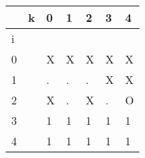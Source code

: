 \documentclass{article}
\begin{document}
    \begin{center}

    \large
        \begin{tabular}{| m{.35cm} | m{.35cm} | m{.35cm} | m{.35cm} | m{.35cm} | m{.35cm} | m{.35cm} |}

            \hline
            & k & 0 & 1 & 2 & 3 & 4 \\
            \hline
            i & &  &  &  &  &  \\
            \hline
            0 & & X & X & X & X & X \\
            \hline
            1 & & . & . & . & X & X \\
            \hline
            2 & & X & . & X & . & O \\
            \hline
            3 & & 1 & 1 & 1 & 1 & 1 \\
            \hline
            4 & & 1 & 1 & 1 & 1 & 1 \\
            \hline
        
    \end{tabular}
    \end{center}
\end{document}
